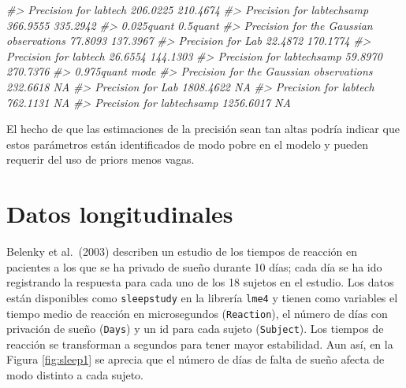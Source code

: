 \documentclass[
]{book}
\newenvironment{Shaded}{\begin{snugshade}}{\end{snugshade}}
\newcommand{\CommentTok}[1]{\textcolor[rgb]{0.56,0.35,0.01}{\textit{#1}}}
\begin{document}
\begin{Shaded}
\begin{Highlighting}[]
\CommentTok{\#\textgreater{} Precision for labtech                   206.0225 210.4674}
\CommentTok{\#\textgreater{} Precision for labtechsamp               366.9555 335.2942}
\CommentTok{\#\textgreater{}                                         0.025quant 0.5quant}
\CommentTok{\#\textgreater{} Precision for the Gaussian observations    77.8093 137.3967}
\CommentTok{\#\textgreater{} Precision for Lab                          22.4872 170.1774}
\CommentTok{\#\textgreater{} Precision for labtech                      26.6554 144.1303}
\CommentTok{\#\textgreater{} Precision for labtechsamp                  59.8970 270.7376}
\CommentTok{\#\textgreater{}                                         0.975quant mode}
\CommentTok{\#\textgreater{} Precision for the Gaussian observations   232.6618   NA}
\CommentTok{\#\textgreater{} Precision for Lab                        1808.4622   NA}
\CommentTok{\#\textgreater{} Precision for labtech                     762.1131   NA}
\CommentTok{\#\textgreater{} Precision for labtechsamp                1256.6017   NA}
\end{Highlighting}
\end{Shaded}

El hecho de que las estimaciones de la precisión sean tan altas podría indicar que estos parámetros están identificados de modo pobre en el modelo y pueden requerir del uso de priors menos vagas.

\hypertarget{datos-longitudinales}{%
\section{Datos longitudinales}\label{datos-longitudinales}}

Belenky et al.~(2003) describen un estudio de los tiempos de reacción en pacientes a los que se ha privado de sueño durante 10 días; cada día se ha ido registrando la respuesta para cada uno de los 18 sujetos en el estudio. Los datos están disponibles como \texttt{sleepstudy} en la librería \texttt{lme4} y tienen como variables el tiempo medio de reacción en microsegundos (\texttt{Reaction}), el número de días con privación de sueño (\texttt{Days}) y un id para cada sujeto (\texttt{Subject}). Los tiempos de reacción se transforman a segundos para tener mayor estabilidad. Aun así, en la Figura \ref{fig:sleep1} se aprecia que el número de días de falta de sueño afecta de modo distinto a cada sujeto.
\end{document}
